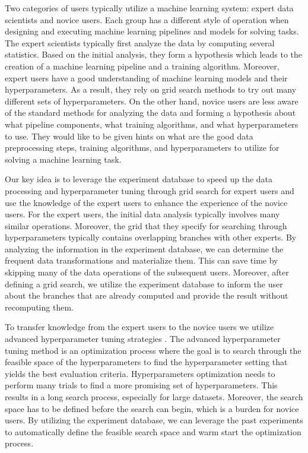 Two categories of users typically utilize a machine learning system: expert data scientists and novice users.
Each group has a different style of operation when designing and executing machine learning pipelines and models for solving tasks.
The expert scientists typically first analyze the data by computing several statistics.
Based on the initial analysis, they form a hypothesis which leads to the creation of a machine learning pipeline and a training algorithm.
Moreover, expert users have a good understanding of machine learning models and their hyperparameters.
As a result, they rely on grid search methods to try out many different sets of hyperparameters.
On the other hand, novice users are less aware of the standard methods for analyzing the data and forming a hypothesis about what pipeline components, what training algorithms, and what hyperparameters to use. 
They would like to be given hints on what are the good data preprocessing steps, training algorithms, and hyperparameters to utilize for solving a machine learning task.

Our key idea is to leverage the experiment database to speed up the data processing and hyperparameter tuning through grid search for expert users and use the knowledge of the expert users to enhance the experience of the novice users.
For the expert users, the initial data analysis typically involves many similar operations.
Moreover, the grid that they specify for searching through hyperparameters typically contains overlapping branches with other experts.
By analyzing the information in the experiment database, we can determine the frequent data transformations and materialize them.
This can save time by skipping many of the data operations of the subsequent users.
Moreover, after defining a grid search, we utilize the experiment database to inform the user about the branches that are already computed and provide the result without recomputing them.

To transfer knowledge from the expert users to the novice users we utilize advanced hyperparameter tuning strategies \citep{bergstra2013making, hutter2011sequential, snoek2012practical}.
The advanced hyperparameter tuning method is an optimization process where the goal is to search through the feasible space of the hyperparameters to find the hyperparameter setting that yields the best evaluation criteria.
Hyperparameters optimization needs to perform many trials to find a more promising set of hyperparameters. 
This results in a long search process, especially for large datasets.
Moreover, the search space has to be defined before the search can begin, which is a burden for novice users.
By utilizing the experiment database, we can leverage the past experiments to automatically define the feasible search space and warm start the optimization process.

